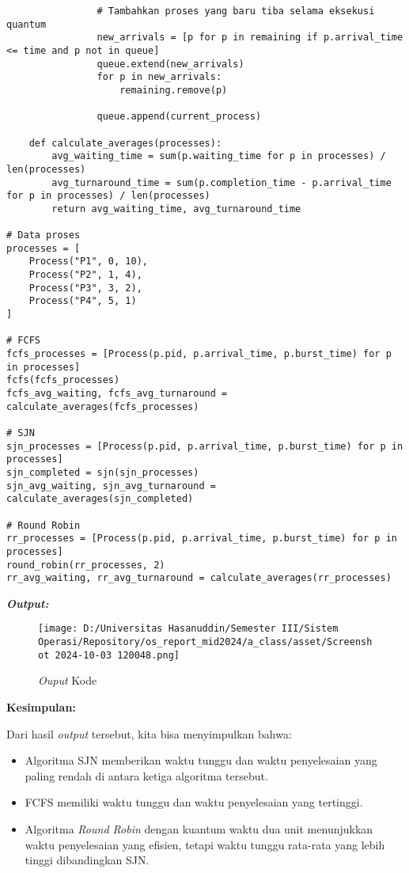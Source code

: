 \documentclass[12pt]{article}
\begin{document}
\begin{lstlisting}
                # Tambahkan proses yang baru tiba selama eksekusi quantum
                new_arrivals = [p for p in remaining if p.arrival_time <= time and p not in queue]
                queue.extend(new_arrivals)
                for p in new_arrivals:
                    remaining.remove(p)
                
                queue.append(current_process)

    def calculate_averages(processes):
        avg_waiting_time = sum(p.waiting_time for p in processes) / len(processes)
        avg_turnaround_time = sum(p.completion_time - p.arrival_time for p in processes) / len(processes)
        return avg_waiting_time, avg_turnaround_time

# Data proses
processes = [
    Process("P1", 0, 10),
    Process("P2", 1, 4),
    Process("P3", 3, 2),
    Process("P4", 5, 1)
]

# FCFS
fcfs_processes = [Process(p.pid, p.arrival_time, p.burst_time) for p in processes]
fcfs(fcfs_processes)
fcfs_avg_waiting, fcfs_avg_turnaround = calculate_averages(fcfs_processes)

# SJN
sjn_processes = [Process(p.pid, p.arrival_time, p.burst_time) for p in processes]
sjn_completed = sjn(sjn_processes)
sjn_avg_waiting, sjn_avg_turnaround = calculate_averages(sjn_completed)

# Round Robin
rr_processes = [Process(p.pid, p.arrival_time, p.burst_time) for p in processes]
round_robin(rr_processes, 2)
rr_avg_waiting, rr_avg_turnaround = calculate_averages(rr_processes)
\end{lstlisting}

\textbf{\textit{Output:}}

\begin{figure}[h]
    \centering
    \texttt{[image: D:/Universitas Hasanuddin/Semester III/Sistem Operasi/Repository/os\_report\_mid2024/a\_class/asset/Screenshot 2024-10-03 120048.png]}
    \caption{\textit{Ouput} Kode}
\end{figure}

\textbf{Kesimpulan:}

Dari hasil \textit{output} tersebut, kita bisa menyimpulkan bahwa:

\begin{itemize}
    \item Algoritma SJN memberikan waktu tunggu dan waktu penyelesaian yang paling rendah di antara ketiga algoritma tersebut.
    \item FCFS memiliki waktu tunggu dan waktu penyelesaian yang tertinggi.
    \item Algoritma \textit{Round Robin} dengan kuantum waktu dua unit menunjukkan waktu penyelesaian yang efisien, tetapi waktu tunggu rata-rata yang lebih tinggi dibandingkan SJN.
\end{itemize}
\end{document}
